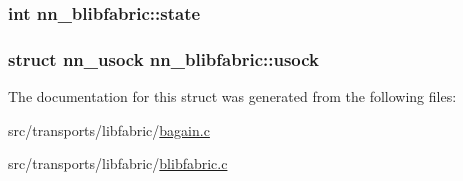 \subsubsection[{state}]{\setlength{\rightskip}{0pt plus 5cm}int nn\+\_\+blibfabric\+::state}\hypertarget{structnn__blibfabric_a215abc4fe37a396adedc66ee4af7de61}{}\label{structnn__blibfabric_a215abc4fe37a396adedc66ee4af7de61}
\subsubsection[{usock}]{\setlength{\rightskip}{0pt plus 5cm}struct {\bf nn\+\_\+usock} nn\+\_\+blibfabric\+::usock}\hypertarget{structnn__blibfabric_acb29026f7306bc1de9ec8fdbbdde54af}{}\label{structnn__blibfabric_acb29026f7306bc1de9ec8fdbbdde54af}


The documentation for this struct was generated from the following files\+:\begin{DoxyCompactItemize}
\item 
src/transports/libfabric/\hyperlink{bagain_8c}{bagain.\+c}\item 
src/transports/libfabric/\hyperlink{blibfabric_8c}{blibfabric.\+c}\end{DoxyCompactItemize}
